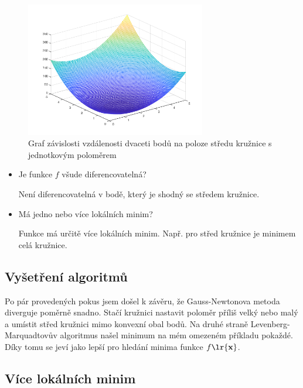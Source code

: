 \begin{figure}[H]
    \centering
    \includegraphics[width=0.7\textwidth]{../20points.png}
    \caption{Graf závislosti vzdálenosti dvaceti bodů na poloze středu kružnice s jednotkovým poloměrem}
\end{figure}

\begin{itemize}
    \item Je funkce \( f \) všude diferencovatelná?

    Není diferencovatelná v bodě, který je shodný se středem kružnice.

    \item Má jedno nebo více lokálních minim?

    Funkce má určitě více lokálních minim. Např. pro střed kružnice je minimem celá kružnice.
\end{itemize}

\subsection{Vyšetření algoritmů}

Po pár provedených pokus jsem došel k závěru, že Gauss-Newtonova metoda diverguje poměrně snadno. Stačí kružnici nastavit poloměr příliš velký nebo malý a umístit střed kružnici mimo konvexní obal bodů. Na druhé straně Levenberg-Marquadtovův algoritmus našel minimum na mém omezeném příkladu pokaždé. Díky tomu se jeví jako lepší pro hledání minima funkce \( f \lr{\bf{x}} \).

\subsection{Více lokálních minim}


